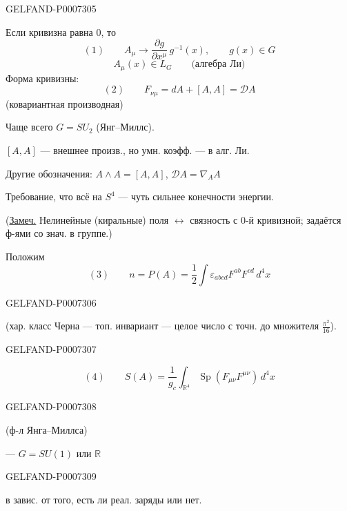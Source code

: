 \begin{GelfandAdjacentEvidence}{GELFAND-P000730}{5}


Если кривизна равна 0, то
\[
(1)\qquad A_\mu\longrightarrow\frac{\partial g}{\partial x^\mu}\,g^{-1}(x),
\qquad g(x)\in G
\]
\[
A_\mu(x)\in L_G\qquad\text{(алгебра Ли)}
\]
Форма кривизны:
\[
(2)\qquad F_{\nu\mu}=dA+[A,A]=\mathcal D A
\]
(ковариантная производная)

Чаще всего \(G=SU_2\) (Янг--Миллс).

\([A,A]\) --- внешнее произв., но умн. коэфф. --- в алг. Ли.

Другие обозначения: \(A\wedge A=[A,A]\), \(\mathcal D A=\nabla_A A\)

Требование, что всё на \(S^4\) --- чуть сильнее конечности энергии.

(\underline{Замеч.} Нелинейные (киральные) поля \(\leftrightarrow\) связность с 0-й кривизной;
задаётся ф-ями со знач. в группе.)

Положим
\[
(3)\qquad n=P(A)=\frac12\int\varepsilon_{abcd}F^{ab}F^{cd}\,d^4x
\]
\end{GelfandAdjacentEvidence}
\begin{GelfandAdjacentEvidence}{GELFAND-P000730}{6}

(хар. класс Черна --- топ. инвариант --- целое число с точн. до множителя \(\frac{\pi^2}{16}\)).
\end{GelfandAdjacentEvidence}
\begin{GelfandAdjacentEvidence}{GELFAND-P000730}{7}


\[
(4)\qquad S(A)=\frac1{g_c}\int_{\mathbb R^4}
       \operatorname{Sp}(F_{\mu\nu}F^{\mu\nu})\,d^4x
\]
\end{GelfandAdjacentEvidence}
\begin{GelfandAdjacentEvidence}{GELFAND-P000730}{8}

(ф-л Янга--Миллса)

 --- \(G=SU(1)\) или \(\mathbb R\)
\end{GelfandAdjacentEvidence}
\begin{GelfandAdjacentEvidence}{GELFAND-P000730}{9}


в завис. от того, есть ли реал. заряды или нет.
\end{GelfandAdjacentEvidence}


